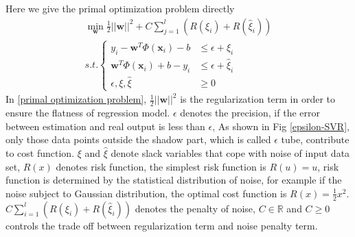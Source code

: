 \documentclass[12pt, draftclsnofoot, onecolumn]{IEEEtran}
\begin{document}
\begin{spacing}{2}
Here we give the primal optimization problem directly
\begin{eqnarray}
\nonumber
\min_{\mathbf{w}} \frac{1}{2}||\mathbf{w}||^{2}+C\sum_{j=1}^{l}(R(\xi_{i})+R(\hat{\xi}_{i}))\\
s.t. \left\{\begin{array}{ll}
y_{i}-\mathbf{w}^{T}\Phi(\mathbf{x}_{i})-b &\leq \epsilon+\xi_{i}\\
\mathbf{w}^{T}\Phi(\mathbf{x}_{i})+b-y_{i} &\leq \epsilon+\hat{\xi}_{i}\\
\epsilon, \xi,\hat{\xi} &\geq 0
\end{array}\right.
\label{primal optimization problem}
\end{eqnarray}
In \ref{primal optimization problem}, $\frac{1}{2}||\mathbf{w}||^{2}$ is the regularization term in order to ensure the flatness of regression model. $\epsilon$ denotes the precision, if the error between estimation and real output is less than $\epsilon$, As shown in Fig \ref{epsilon-SVR}, only those data points outside the shadow part, which is called $\epsilon$ tube, contribute to cost function. $\xi$ and $\hat{\xi}$ denote slack variables that cope with noise of input data set, $R(x)$ denotes risk function, the simplest risk function is $R(u)=u$, risk function is determined by the statistical distribution of noise\cite{smola2004tutorial}, for example if the noise subject to Gaussian distribution, the optimal cost function is $R(x)=\frac{1}{2}x^{2}$. $C\sum_{i=1}^{l}(R(\xi_{i})+R(\hat{\xi}_{i}))$ denotes the penalty of noise, $C\in \mathbb{R}$ and $C\geq 0$ controls the trade off between regularization term and noise penalty term.

\end{spacing}
\end{document}
